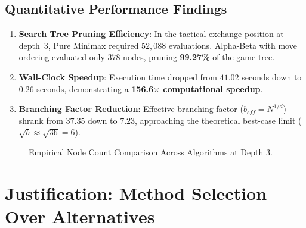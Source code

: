 \documentclass[11pt,a4paper]{article}
\begin{document}
\subsection{Quantitative Performance Findings}
\begin{enumerate}[leftmargin=*]
    \item \textbf{Search Tree Pruning Efficiency}: In the tactical exchange position at depth~3, Pure Minimax required $52,088$ evaluations. Alpha-Beta with move ordering evaluated only $378$ nodes, pruning \textbf{99.27\%} of the game tree.
    \item \textbf{Wall-Clock Speedup}: Execution time dropped from $41.02$ seconds down to $0.26$ seconds, demonstrating a \textbf{156.6$\times$ computational speedup}.
    \item \textbf{Branching Factor Reduction}: Effective branching factor ($b_{eff} = N^{1/d}$) shrank from $37.35$ down to $7.23$, approaching the theoretical best-case limit ($\sqrt{b} \approx \sqrt{36} = 6$).
\end{enumerate}

\begin{figure}[htbp]
\centering
{}
\caption{Empirical Node Count Comparison Across Algorithms at Depth 3.}
\label{fig:nodes_chart}
\end{figure}

\section{Justification: Method Selection Over Alternatives}
\end{document}
